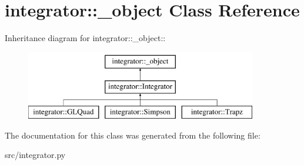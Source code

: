 \hypertarget{classintegrator_1_1__object}{
\section{integrator::\_\-object Class Reference}
\label{d6/d0c/classintegrator_1_1__object}
}
Inheritance diagram for integrator::\_\-object::\begin{figure}[H]
\begin{center}
\leavevmode
\includegraphics[height=3cm]{d6/d0c/classintegrator_1_1__object}
\end{center}
\end{figure}


The documentation for this class was generated from the following file:\begin{DoxyCompactItemize}
\item 
src/integrator.py\end{DoxyCompactItemize}
